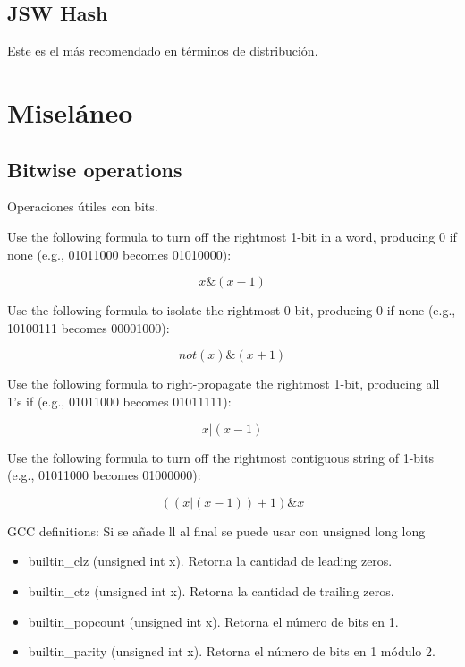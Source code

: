\documentclass[10pt,letterpaper,twocolumn,twosided]{article}
\newcommand{\codigofuente}[1]{

\dotfill
}
\begin{document}
\subsection{JSW Hash}
Este es el más recomendado en términos de distribución.
\codigofuente{src/hashing/JSW.cpp}

\section{Miseláneo}

\subsection {Bitwise operations}
Operaciones útiles con bits.

Use the following formula to turn off the rightmost 1-bit in a word, producing
0 if none (e.g., 01011000 becomes 01010000):

$$x \& (x - 1)$$

Use the following formula to isolate the rightmost 0-bit, producing 0 if none
(e.g., 10100111 becomes 00001000):

$$ not(x) \& (x + 1)$$

Use the following formula to right-propagate the rightmost 1-bit, producing
all 1’s if  (e.g., 01011000 becomes 01011111):

$$ x | (x - 1 )$$

Use the following formula to turn off the rightmost contiguous string of 1-bits
(e.g., 01011000 becomes 01000000):

$$ ((x | (x - 1 )) + 1 ) \& x$$

\codigofuente{src/bitwise.cpp}

GCC definitions:
Si se añade ll al final se puede usar con unsigned long long

\begin{itemize}
\item \verb __builtin_clz (unsigned int x). Retorna la cantidad de leading zeros.
\item \verb __builtin_ctz (unsigned int x). Retorna la cantidad de trailing zeros.
\item \verb __builtin_popcount (unsigned int x). Retorna el número de bits en 1.
\item \verb __builtin_parity (unsigned int x). Retorna el número de bits en 1 módulo 2.
\end{itemize}


\end{document}
